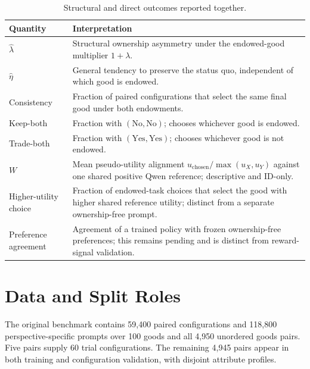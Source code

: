 \documentclass[11pt,letterpaper]{article}
\begin{document}
\begin{table}[htbp]
\centering
\small
\begin{tabular}{p{}p{}}
\toprule
Quantity & Interpretation \\
\midrule
$\widehat\lambda$ & Structural ownership asymmetry under the endowed-good multiplier $1+\lambda$. \\
$\widehat\eta$ & General tendency to preserve the status quo, independent of which good is endowed. \\
Consistency & Fraction of paired configurations that select the same final good under both endowments. \\
Keep-both & Fraction with $(\text{No},\text{No})$; chooses whichever good is endowed. \\
Trade-both & Fraction with $(\text{Yes},\text{Yes})$; chooses whichever good is not endowed. \\
$W$ & Mean pseudo-utility alignment $u_{\mathrm{chosen}}/\max(u_X,u_Y)$ against one shared positive Qwen reference; descriptive and ID-only. \\
Higher-utility choice & Fraction of endowed-task choices that select the good with higher shared reference utility; distinct from a separate ownership-free prompt. \\
Preference agreement & Agreement of a trained policy with frozen ownership-free preferences; this remains pending and is distinct from reward-signal validation. \\
\bottomrule
\end{tabular}
\caption{Structural and direct outcomes reported together.}
\label{tab:metrics}
\end{table}

\section{Data and Split Roles}

The original benchmark contains 59,400 paired configurations and 118,800
perspective-specific prompts over 100 goods and all 4,950 unordered goods
pairs. Five pairs supply 60 trial configurations. The remaining 4,945 pairs
appear in both training and configuration validation, with disjoint attribute
profiles.
\end{document}

